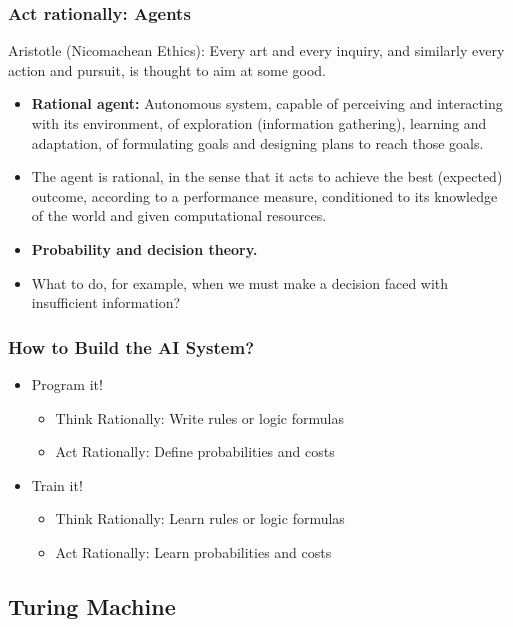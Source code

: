 \documentclass[UTF8,11pt,colorlinks,compress,openany]{beamer}%
\begin{document}
\begin{frame}\frametitle{Act rationally: Agents}
Aristotle (Nicomachean Ethics): Every art and every inquiry, and similarly every action and pursuit, is thought to aim at some good.
\begin{itemize}
	\item \textbf{Rational agent:} Autonomous system, capable of perceiving and interacting with its environment, of exploration (information gathering), learning and adaptation, of formulating goals and designing plans to reach those goals.
	\item The agent is rational, in the sense that it acts to achieve the best (expected) outcome, according to a performance measure, conditioned to its knowledge of the world and given computational resources.
	\item \textbf{Probability and decision theory.}
	\item What to do, for example, when we must make a decision faced with insufficient information?
\end{itemize}
\end{frame}

\begin{frame}\frametitle{How to Build the AI System?}
\begin{itemize}
	\item Program it!
	\begin{itemize}
		\item Think Rationally: Write rules or logic formulas
		\item Act Rationally: Define probabilities and costs
	\end{itemize}
	\item Train it!
	\begin{itemize}
		\item Think Rationally: Learn rules or logic formulas
		\item Act Rationally: Learn probabilities and costs
	\end{itemize}
\end{itemize}
\end{frame}

\subsection{Turing Machine}
\end{document}
